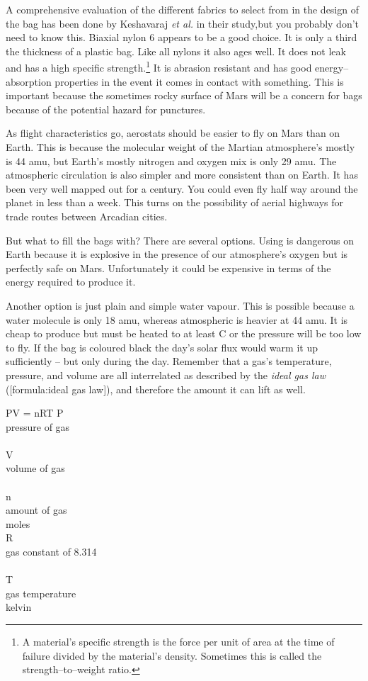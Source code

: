 A comprehensive evaluation of the different fabrics to select from in the design of the bag has been done by Keshavaraj {\it et al.} in their study,\footnotecite[keshavaraj1996] but you probably don't need to know this. Biaxial nylon 6 appears to be a good choice. It is only a third the thickness of a plastic bag. Like all nylons it also ages well. It does not leak and has a high specific strength.\footnote{A material's specific strength is the force per unit of area at the time of failure divided by the material's density. Sometimes this is called the strength--to--weight ratio.} It is abrasion resistant and has good energy--absorption properties in the event it comes in contact with something. This is important because the sometimes rocky surface of Mars will be a concern for bags because of the potential hazard for punctures.

As flight characteristics go, aerostats should be easier to fly on Mars than on Earth. This is because the molecular weight of the Martian atmosphere's mostly  is 44 amu, but Earth's mostly nitrogen and oxygen mix is only 29 amu. The atmospheric circulation is also simpler and more consistent than on Earth. It has been very well mapped out for a century. You could even fly half way around the planet in less than a week. This turns on the possibility of aerial highways for trade routes between Arcadian cities.

But what to fill the bags with? There are several options. Using  is dangerous on Earth because it is explosive in the presence of our atmosphere's oxygen but is perfectly safe on Mars. Unfortunately it could be expensive in terms of the energy required to produce it. 

Another option is just plain and simple water vapour. This is possible because a water molecule is only 18 amu, whereas atmospheric  is heavier at 44 amu. It is cheap to produce but must be heated to at least C or the pressure will be too low to fly. If the bag is coloured black the day's solar flux would warm it up sufficiently -- but only during the day. Remember that a gas's temperature, pressure, and volume are all interrelated as described by the {\it ideal gas law} ([formula:ideal gas law]), and therefore the amount it can lift as well.

\vfill
{}
\startformula
PV = nRT
\stopformula
\startlegend
\leg P \\ pressure of gas \\ \\
\leg V \\ volume of gas \\ \\
\leg n \\ amount of gas \\ moles \\
\leg R \\ gas constant of 8.314 \\  \\
\leg T \\ gas temperature \\ kelvin \\
\stoplegend
\vfill

